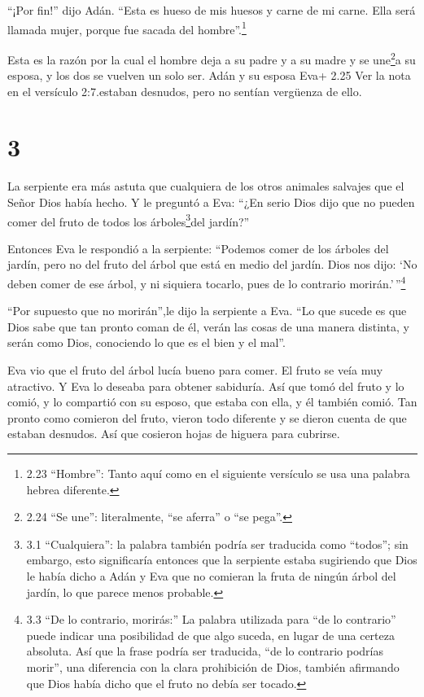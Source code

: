  ``¡Por fin!'' dijo Adán. ``Esta es hueso de mis huesos y
carne de mi carne. Ella será llamada mujer, porque fue sacada del
hombre''.\footnote{2.23 ``Hombre'': Tanto aquí como en el siguiente
  versículo se usa una palabra hebrea diferente.}

 Esta es la razón por la cual el hombre deja a su padre y a
su madre y se une\footnote{2.24 ``Se une'': literalmente, ``se aferra''
  o ``se pega''.}a su esposa, y los dos se vuelven un solo ser.
 Adán y su esposa Eva+ 2.25 Ver la nota en el versículo
2:7.estaban desnudos, pero no sentían vergüenza de ello.

\hypertarget{section-2}{%
\section{3}\label{section-2}}

 La serpiente era más astuta que cualquiera de los otros
animales salvajes que el Señor Dios había hecho. Y le preguntó a Eva:
``¿En serio Dios dijo que no pueden comer del fruto de todos los
árboles\footnote{3.1 ``Cualquiera'': la palabra también podría ser
  traducida como ``todos''; sin embargo, esto significaría entonces que
  la serpiente estaba sugiriendo que Dios le había dicho a Adán y Eva
  que no comieran la fruta de ningún árbol del jardín, lo que parece
  menos probable.}del jardín?''

 Entonces Eva le respondió a la serpiente: ``Podemos comer
de los árboles del jardín, pero no del fruto del árbol que está en medio
del jardín.  Dios nos dijo: `No deben comer de ese árbol, y
ni siquiera tocarlo, pues de lo contrario morirán.'\,''\footnote{3.3
  ``De lo contrario, morirás:'' La palabra utilizada para ``de lo
  contrario'' puede indicar una posibilidad de que algo suceda, en lugar
  de una certeza absoluta. Así que la frase podría ser traducida, ``de
  lo contrario podrías morir'', una diferencia con la clara prohibición
  de Dios, también afirmando que Dios había dicho que el fruto no debía
  ser tocado.}

 ``Por supuesto que no morirán'',le dijo la serpiente a Eva.
 ``Lo que sucede es que Dios sabe que tan pronto coman de
él, verán las cosas de una manera distinta, y serán como Dios,
conociendo lo que es el bien y el mal''.

 Eva vio que el fruto del árbol lucía bueno para comer. El
fruto se veía muy atractivo. Y Eva lo deseaba para obtener sabiduría.
Así que tomó del fruto y lo comió, y lo compartió con su esposo, que
estaba con ella, y él también comió.  Tan pronto como
comieron del fruto, vieron todo diferente y se dieron cuenta de que
estaban desnudos. Así que cosieron hojas de higuera para cubrirse.

